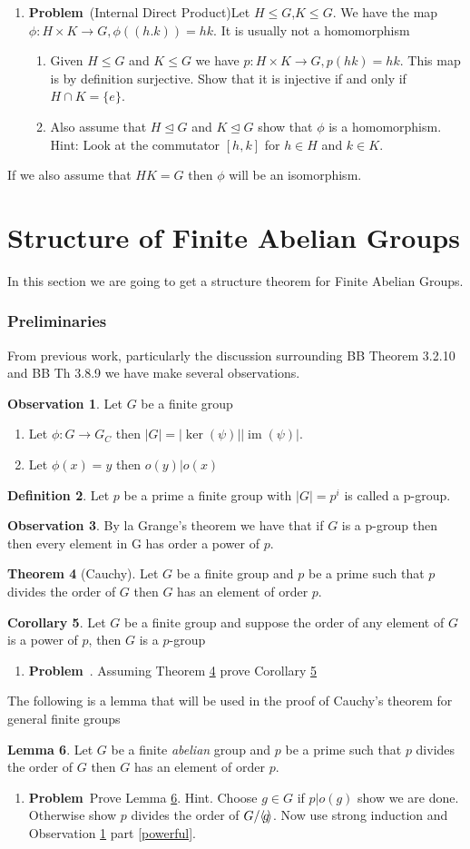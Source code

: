 \documentclass[12pt]{amsart}
\newcommand{\benu}{\begin{enumerate}}
\newcommand{\eenu}{\end{enumerate}}
\theoremstyle{definition}
\newtheorem{theorem}{Theorem}
\newcommand{\bet}{\begin{theorem}}
\newcommand{\et}{\end{theorem}}
\newtheorem{lemma}[theorem]{Lemma}
\newcommand{\bel}{\begin{lemma}}
\newcommand{\el}{\end{lemma}}
\newtheorem{corollary}[theorem]{Corollary}
\newcommand{\bec}{\begin{corollary}}
\newcommand{\ec}{\end{corollary}}
\newtheorem{observation}[theorem]{Observation}
\newcommand{\bo}{\begin{observation}}
\newcommand{\eo}{\end{observation}}
\newtheorem{definition}[theorem]{Definition}
\newcommand{\bdf}{\begin{definition}}
\newcommand{\edf}{\end{definition}}
\DeclareMathOperator{\im}{im}
\newcommand{\nts}{\negthinspace}
\newcommand{\itep}{\item {\bfseries Problem}\ }
\newcommand{\gen}[1]{\langle \nts#1 \nts\rangle}
\begin{document}
\begin{enumerate}[resume=p]
\itep (Internal Direct Product)Let $H\leq G$,$K\leq G$. We have the map $\phi\colon H\times K\to G,\phi((h.k))=hk$. It is usually not a homomorphism
\benu
\item Given $H\leq G$ and $K\leq G$ we have $p\colon H\times K\to G,p(hk)=hk$. This map is by definition surjective. Show that it is injective if and only if $H\cap K=\{e\}$.
\item Also assume that $H\unlhd G$ and $K\unlhd G$ show that $\phi$ is a homomorphism. Hint: Look at the commutator $[h,k]$ for $h\in H$ and $k\in K$.
\eenu
\end{enumerate}
If we also assume that $HK=G$ then $\phi$ will be an isomorphism.
\section{Structure of Finite Abelian Groups}
In this section we are going to get a structure theorem for Finite Abelian Groups.

\subsubsection{Preliminaries}

From previous work, particularly the discussion surrounding BB Theorem 3.2.10 and BB Th 3.8.9 we have make several observations.
\bo \label{countfin} Let $G$ be a finite group
\benu 
\item Let $\phi\colon G\to G_C$ then $|G|=|\ker(\psi)||\im(\psi)|$.
\item \label{powerful} Let $\phi(x)=y$ then $o(y)|o(x)$
\eenu
\eo

\bdf Let $p$ be a prime a finite group with $|G|=p^i$ is called a p-group.
\edf
\bo By la Grange's theorem we have that if $G$ is a p-group then then every element in G has order a power of $p$.
\eo
\bet[Cauchy] \label{ct} Let $G$ be a finite group and $p$ be a prime such that $p$ divides the order of $G$ then $G$ has an element of order $p$.
\et
\bec \label{corpgroup} Let $G$ be a finite group and suppose the order of any element of $G$ is a power of $p$, then $G$ is a $p$-group
\ec
\begin{enumerate}[resume=p]
\itep. Assuming Theorem \ref{ct} prove Corollary \ref{corpgroup}
\end{enumerate} 

The following is a lemma that will be used in the proof of Cauchy's theorem for general finite groups
\bel \label{cauchyabelian} Let $G$ be a finite {\em abelian} group and $p$ be a prime such that $p$ divides the order of $G$ then $G$ has an element of order $p$.
\el
\begin{enumerate}
\itep Prove Lemma \ref{cauchyabelian}. Hint. Choose $g\in G$ if $p|o(g)$ show we are done. Otherwise show $p$ divides the order of $G/\gen{g}$. Now use strong induction and Observation \ref{countfin} part \ref{powerful}.
\end{enumerate}
\end{document}

